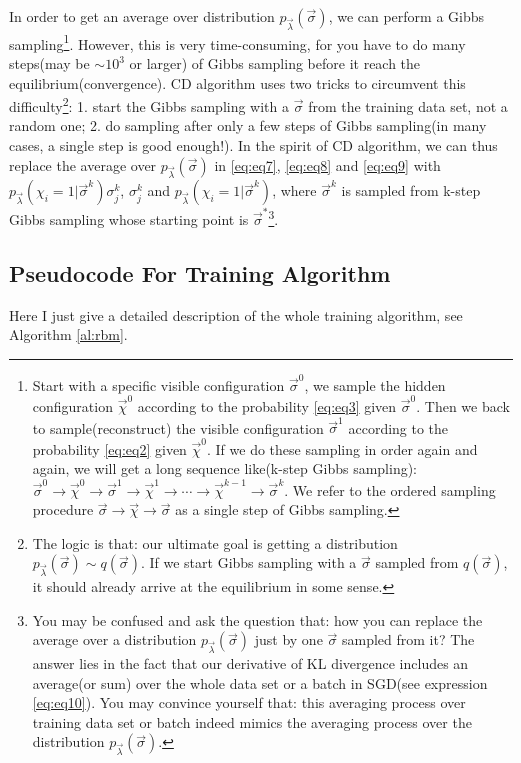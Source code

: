 \documentclass[letterpaper, 10pt]{article}
\begin{document}
In order to get an average over distribution $p_{\vec{\lambda}}(\vec{\sigma})$, we can perform a Gibbs sampling\footnote{Start with a specific visible configuration $\vec{\sigma}^0$, we sample the hidden configuration $\vec{\chi}^0$ according to the probability \ref{eq:eq3} given $\vec{\sigma}^0$. Then we back to sample(reconstruct) the visible configuration $\vec{\sigma}^1$ according to the probability \ref{eq:eq2} given $\vec{\chi}^0$. If we do these sampling in order again and again, we will get a long sequence like(k-step Gibbs sampling): $\vec{\sigma}^0 \rightarrow \vec{\chi}^0 \rightarrow \vec{\sigma}^1 \rightarrow \vec{\chi}^1 \rightarrow \cdots \rightarrow \vec{\chi}^{k-1} \rightarrow \vec{\sigma}^k$. We refer to the ordered sampling procedure $\vec{\sigma} \rightarrow \vec{\chi} \rightarrow \vec{\sigma}$ as a single step of Gibbs sampling.}. However, this is very time-consuming,  for you have to do many steps(may be $\sim 10^3$ or larger) of Gibbs sampling before it reach the equilibrium(convergence). CD algorithm uses two tricks to circumvent this difficulty\footnote{The logic is that: our ultimate goal is getting a distribution $p_{\vec{\lambda}}(\vec{\sigma}) \sim q(\vec{\sigma}).$ If we start Gibbs sampling with a $\vec{\sigma}$ sampled from $q(\vec{\sigma})$, it should already arrive at the equilibrium in some sense.}: 1. start the Gibbs sampling with a $\vec{\sigma}$ from the training data set, not a random one; 2. do sampling after only a few steps of Gibbs sampling(in many cases, a single step is good enough!). In the spirit of CD algorithm, we can thus replace the average over $p_{\vec{\lambda}}(\vec{\sigma})$ in \ref{eq:eq7}, \ref{eq:eq8} and \ref{eq:eq9} with $p_{\vec{\lambda}}(\chi_i=1 | \vec{\sigma}^k) \sigma_j^k$,  $\sigma_j^k$ and $p_{\vec{\lambda}}(\chi_i=1 | \vec{\sigma}^k)$, where $\vec{\sigma}^k$ is sampled from k-step Gibbs sampling whose starting point is $\vec{\sigma}^*$\footnote{You may be confused and ask the question that: how you can replace the average over a distribution $p_{\vec{\lambda}}(\vec{\sigma})$ just by one $\vec{\sigma}$ sampled from it? The answer lies in the fact that our derivative of KL divergence includes an average(or sum) over the whole data set or a batch in SGD(see expression \ref{eq:eq10}). You may convince yourself that: this averaging process over training data set or batch indeed mimics the averaging process over the distribution $p_{\vec{\lambda}}(\vec{\sigma})$.}.

\subsection{Pseudocode For Training Algorithm}
Here I just give a detailed description of the whole training algorithm, see Algorithm \ref{al:rbm}.
\end{document}
